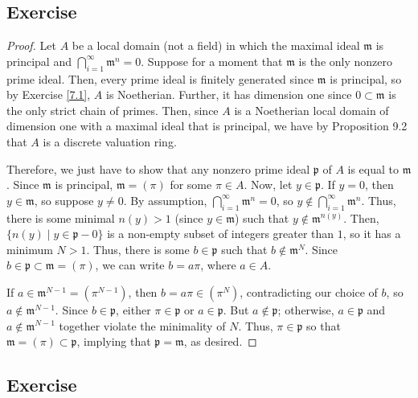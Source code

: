 \subsection{Exercise}\label{9.4}

\begin{proof}
Let $A$ be a local domain (not a field) in which the maximal ideal $\mathfrak{m}$ is principal and $\bigcap_{i=1}^{\infty}\mathfrak{m}^n = 0$. Suppose for a moment
that $\mathfrak{m}$ is the only nonzero prime ideal. Then, every prime ideal is finitely generated since $\mathfrak{m}$ is principal, so by Exercise \ref{7.1}, $A$ 
is Noetherian. Further, it has dimension one since $0 \subset \mathfrak{m}$ is the only strict chain of primes. Then, since $A$ is a Noetherian local domain of 
dimension one with a maximal ideal that is principal, we have by Proposition 9.2 that $A$ is a discrete valuation ring.

Therefore, we just have to show that any nonzero prime ideal $\mathfrak{p}$ of $A$ is equal to $\mathfrak{m}$. Since $\mathfrak{m}$ is principal, $\mathfrak{m} = (\pi)$ 
for some $\pi \in A$. Now, let $y \in \mathfrak{p}$. If $y = 0$, then $y \in \mathfrak{m}$, so suppose $y \neq 0$. By assumption, $\bigcap_{i=1}^{\infty}\mathfrak{m}^n = 0$, 
so $y \not\in \bigcap_{i=1}^{\infty}\mathfrak{m}^n$. Thus, there is some minimal $n(y) > 1$ (since $y \in \mathfrak{m}$) such that $y \not\in \mathfrak{m}^{n(y)}$. Then, 
$\{n(y) \mid y \in \mathfrak{p} - 0\}$ is a non-empty subset of integers greater than $1$, so it has a minimum $N > 1$. Thus, there is some $b \in \mathfrak{p}$ such that 
$b \not\in \mathfrak{m}^N$. Since $b \in \mathfrak{p} \subset \mathfrak{m} = (\pi)$, we can write $b = a \pi$, where $a \in A$. 

If $a \in \mathfrak{m}^{N-1} = (\pi^{N-1})$, then $b = a \pi \in (\pi^N)$, contradicting our choice of $b$, so $a \not\in \mathfrak{m}^{N-1}$.
Since $b \in \mathfrak{p}$, either $\pi \in \mathfrak{p}$ or $a \in \mathfrak{p}$. But $a \not\in \mathfrak{p}$; otherwise, $a \in \mathfrak{p}$ 
and $a \not\in \mathfrak{m}^{N-1}$ together violate the minimality of $N$. Thus, $\pi \in \mathfrak{p}$ so that $\mathfrak{m} = (\pi) \subset \mathfrak{p}$, 
implying that $\mathfrak{p} = \mathfrak{m}$, as desired.
\end{proof}

\subsection{Exercise}\label{9.5}

